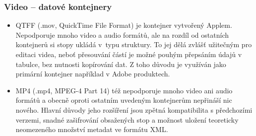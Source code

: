 \documentclass[aspectratio=169,11pt,svgnames,handout]{beamer}
\begin{document}
\begin{frame}
 \frametitle{Video -- datové kontejnery}
 \begin{itemize}[label=\textbullet]
  \item \alert{QTFF} (.mov, QuickTime File Format) je kontejner vytvořený
   Applem. Nepodporuje mnoho video a audio formátů, ale na rozdíl od ostatních
   kontejnerů si stopy ukládá v~typu  struktury. To jej dělá zvlášť
   užitečným pro editaci videa, neboť přesouvání částí je možné pouhým přepsáním
   údajů v tabulce, bez nutnosti kopírování dat. Z toho důvodu je využíván jako
   primární kontejner například v Adobe produktech.
  \pause
  \item \alert{MP4} (.mp4, MPEG-4 Part 14) též nepodporuje mnoho video ani audio
   formátů a obecně oproti ostatním uvedeným kontejnerům nepřináší nic nového.
   Hlavní důvody jeho rozšíření jsou zpětná kompatibilita s předchozími verzemi,
   snadné zašifrování obsažených stop a možnost uložení teoreticky neomezeného
   množství metadat ve formátu XML.
 \end{itemize}
\end{frame}
\end{document}

